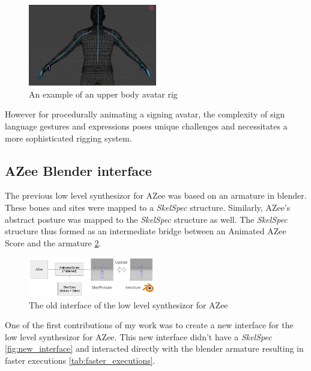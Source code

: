 \documentclass[../../main.tex]{subfiles}
\begin{document}
\begin{figure}[h]
    \centering
    \includegraphics[width=0.5\textwidth]{chapters/rigging_layers/images/upper_body_avatar.png}
    \caption{An example of an upper body avatar rig}
    \label{ref:upper_body_avatar}
\end{figure}

However for procedurally animating a signing avatar, the complexity of sign language gestures and expressions poses unique challenges and necessitates a more sophisticated rigging system.

\subsection{AZee Blender interface}

The previous low level synthesizor for AZee \cite{fabrizio} was based on an armature in blender. These bones and sites were mapped to a \emph{SkelSpec} structure. Similarly, AZee's abstract posture was mapped to the \emph{SkelSpec} structure as well. The \emph{SkelSpec} structure thus formed as an intermediate bridge between an Animated AZee Score and the armature \ref{fig:old_interface}. 

\begin{figure}[h]
    \centering
    \includegraphics[width=0.5\textwidth]{chapters/rigging_layers/images/old_interface.png}
    \caption{The old interface of the low level synthesizor for AZee}
    \label{fig:old_interface}
\end{figure}

One of the first contributions of my work was to create a new interface for the low level synthesizor for AZee. This new interface didn't have a \emph{SkelSpec} \ref{fig:new_interface} and interacted directly with the blender armature resulting in faster executions \ref{tab:faster_executions}.
\end{document}
